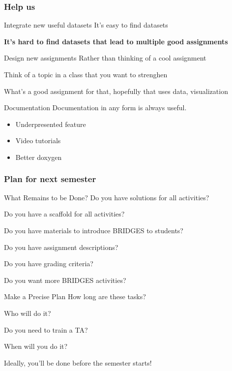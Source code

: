 \documentclass[aspectratio=169]{beamer}
\begin{document}
\begin{frame}
  \frametitle{Help us}
    \begin{block}{Integrate new useful datasets}
      It's easy to find datasets

      \textbf{It's hard to find datasets that lead to multiple good assignments}
    \end{block}

    \begin{block}{Design new assignments}
      Rather than thinking of a cool assignment

      Think of a topic in a class that you want to strenghen

      What's a good assignment for that, hopefully that uses data, visualization      
    \end{block}

    \begin{block}{Documentation}
      Documentation in any form is always useful.
      \begin{itemize}
      \item Underpresented feature
      \item Video tutorials
      \item Better doxygen
      \end{itemize}
    \end{block}
\end{frame}



\begin{frame}
  \frametitle{Plan for next semester}

  \begin{block}{What Remains to be Done?}
    Do you have solutions for all activities?

    Do you have a scaffold for all activities?

    Do you have materials to introduce BRIDGES to students?

    Do you have assignment descriptions?

    Do you have grading criteria?
    
    Do you want more BRIDGES activities?
  \end{block}

  \begin{block}{Make a Precise Plan}
    How long are these tasks?
    
    Who will do it?

    Do you need to train a TA?

    When will you do it?

    Ideally, you'll be done before the semester starts!
  \end{block}
\end{frame}
\end{document}

